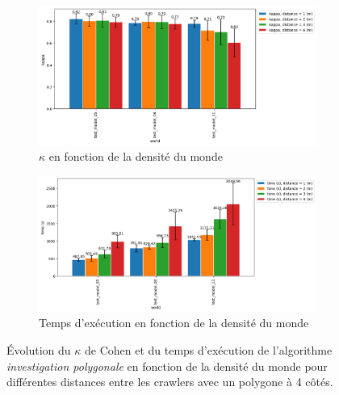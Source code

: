 \documentclass[francais,RandD]{rapportPFE}
\begin{document}
			\begin{figure}[h!]
				\begin{subfigure}[t]{0.9\linewidth}
					\includegraphics[width=\linewidth]{graphics/investigation_polygonale-kappa_vs_world_for_each_d_k1_n2_p4.png}
					\caption{$\kappa$ en fonction de la densité du monde}
					\label{fig:investigation_polygonale-kappa_vs_world_for_each_d_k1_n2_p4}
				\end{subfigure}
				\hfill
				\begin{subfigure}[t]{0.9\linewidth}
						\includegraphics[width=\linewidth]{graphics/investigation_polygonale-time_vs_world_for_each_d_k1_n2_p4.png}
						\caption{Temps d'exécution en fonction de la densité du monde}
						\label{fig:investigation_polygonale-time_vs_world_for_each_d_k1_n2_p4}
				\end{subfigure}
				\caption{Évolution du $\kappa$ de Cohen et du temps d'exécution de l'algorithme \textit{investigation polygonale} en fonction de la densité du monde pour différentes distances entre les crawlers avec un polygone à 4 côtés.}
				\label{fig:investigation_polygonale-world_for_each_d_k1_n2_p4}
			\end{figure}
\end{document}

